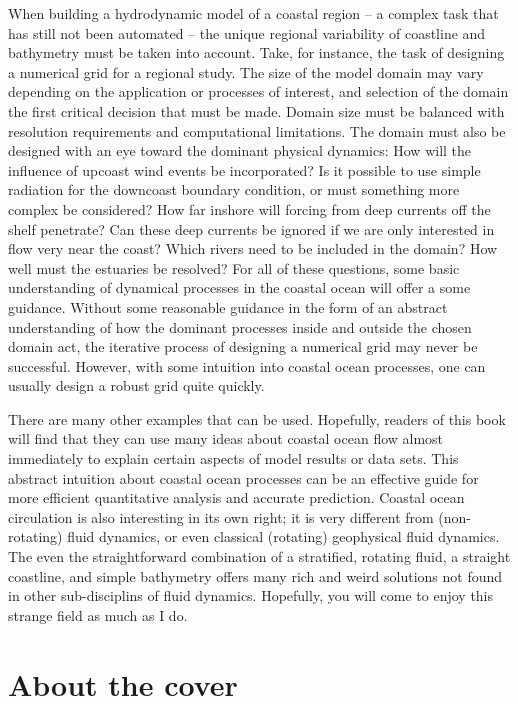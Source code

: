 \documentclass[11pt]{report}
\numberwithin{equation}{section}
\begin{document}
When building a hydrodynamic model of a coastal region -- a complex task that has still not been automated --  the unique regional variability of coastline and bathymetry must be taken into account.  Take, for instance, the task of designing a numerical grid for a regional study.  The size of the model domain may vary depending on the application or processes of interest, and selection of the domain the first critical decision that must be made.  Domain size must be balanced with resolution requirements and computational limitations.  The domain must also be designed with an eye toward the dominant physical dynamics:  How will the influence of upcoast wind events be incorporated?  Is it possible to use simple radiation for the downcoast boundary condition, or must something more complex be considered?  How far inshore will forcing from deep currents off the shelf penetrate?  Can these deep currents be ignored if we are only interested in flow very near the coast?  Which rivers need to be included in the domain?  How well must the estuaries be resolved?  For all of these questions, some basic understanding of dynamical processes in the coastal ocean will offer a some guidance.  Without some reasonable guidance in the form of an abstract understanding of how the dominant processes inside and outside the chosen domain act, the iterative process of designing a numerical grid may never be successful.  However, with some intuition into coastal ocean processes, one can usually design a robust grid quite quickly.  

There are many other examples that can be used.  Hopefully, readers of this book will find that they can use many ideas about coastal ocean flow almost immediately to explain certain aspects of model results or data sets.  This abstract intuition about coastal ocean processes can be an effective guide for more efficient quantitative analysis and accurate prediction.  Coastal ocean circulation is also interesting in its own right; it is very different from (non-rotating) fluid dynamics, or even classical (rotating) geophysical fluid dynamics.  The even the straightforward combination of a stratified, rotating fluid, a straight coastline, and simple bathymetry offers many rich and weird solutions not found in other sub-disciplins of fluid dynamics.  Hopefully, you will come to enjoy this strange field as much as I do.

\section*{About the cover}
\end{document}
